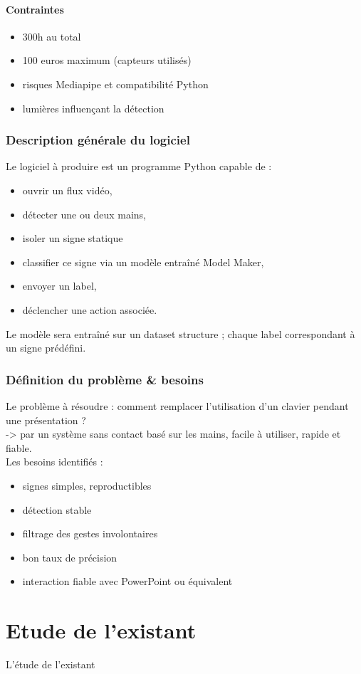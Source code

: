 \documentclass{article}
\begin{document}
\subsection*{Contraintes}
\begin{itemize}
\item 300h au total
\item 100 euros maximum (capteurs utilisés)
\item risques Mediapipe et compatibilité Python
\item lumières influençant la détection
\end{itemize}
\section{Description générale du logiciel}
Le logiciel à produire est un programme Python capable de :
\begin{itemize}
\item ouvrir un flux vidéo,
\item détecter une ou deux mains,
\item isoler un signe statique
\item classifier ce signe via un modèle entraîné Model Maker,
\item envoyer un label,
\item déclencher une action associée.
\end{itemize}
Le modèle sera entraîné sur un dataset structure ; chaque label correspondant à un signe prédéfini.
\section{Définition du problème \& besoins}
Le problème à résoudre : comment remplacer l'utilisation d'un clavier pendant une présentation ? \\
-> par un système sans contact basé sur les mains, facile à utiliser, rapide et fiable. \\
Les besoins identifiés :
\begin{itemize}
\item signes simples, reproductibles
\item détection stable
\item filtrage des gestes involontaires
\item bon taux de précision
\item interaction fiable avec PowerPoint ou équivalent
\end{itemize}
\part*{Etude de l'existant}
L'étude de l'existant
\end{document}
